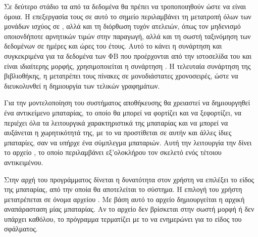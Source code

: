 \documentclass[12pt]{report}
\begin{document}
{}

Σε δεύτερο στάδιο τα {} από τα δεδομένα θα πρέπει να τροποποιηθούν ώστε να είναι όμοια. Η επεξεργασία τους σε αυτό το σημείο περιλαμβάνει τη μετατροπή όλων των μονάδων ισχύος σε {}, αλλά και 
τη διόρθωση τυχόν ατελειών, όπως τον μηδενισμό οποιονδήποτε αρνητικών τιμών στην παραγωγή, αλλά και τη σωστή ταξινόμηση των δεδομένων σε ημέρες και ώρες του έτους. Αυτό το κάνει η συνάρτηση {\textbf{{}}} και 
συγκεκριμένα για τα δεδομένα των ΦΒ που προέρχονται από την ιστοσελίδα του {} και είναι ιδιαίτερης μορφής, χρησιμοποιείται η συνάρτηση {\textbf{{}}}. Η τελευταία συνάρτηση της βιβλιοθήκης, η 
{\textbf{{}}} μετατρέπει τους πίνακες σε μονοδιάστατες χρονοσειρές, ώστε να διευκολυνθεί η δημιουργία των τελικών γραφημάτων.

\begin{center}
\end{center}

Για την μοντελοποίηση του συστήματος αποθήκευσης θα χρειαστεί να δημιουργηθεί ένα αντικείμενο μπαταρίας, το οποίο θα μπορεί να φορτίζει και να ξεφορτίζει, να περιέχει όλα τα λειτουργικά χαρακτηριστικά της μπαταρίας και να μπορεί να 
αυξάνεται η χωρητικότητά της, με το να προστίθεται σε αυτήν και άλλες ίδιες μπαταρίες, σαν να υπήρχε ένα σύμπλεγμα μπαταριών. Αυτή την λειτουργία την δίνει το αρχείο {}, το οποίο περιλαμβάνει εξ'ολοκλήρου 
τον σκελετό ενός τέτοιου αντικειμένου. 

Στην αρχή του προγράμματος δίνεται η δυνατότητα στον χρήστη να επιλέξει το είδος της μπαταρίας, από την οποία θα αποτελείται το σύστημα. Η επιλογή του χρήστη μετατρέπεται σε όνομα αρχείου {}. Με βάση αυτό το αρχείο 
δημιουργείται η αρχική αναπάρασταση μίας μπαταρίας. Αν το αρχείο δεν βρίσκεται στην σωστή μορφή ή δεν υπάρχει καθόλου, το πρόγραμμα τερματίζει με το να ενημερώνει για το είδος του σφάλματος.
\end{document}
